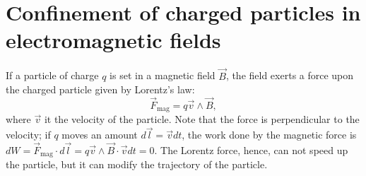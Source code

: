 \documentclass[a4paper,12pt,oneside]{book}
\begin{document}


\section[Confinement of charged particles]{Confinement of charged particles in electromagnetic fields}
\label{sec_drifts}
If a particle of charge $q$ is set in a magnetic field $\vec{B}$, the field exerts a force upon the charged particle given by Lorentz's law:
%
\begin{equation}
\vec{F}_\text{mag}=q \vec{v} \wedge \vec{B},
\end{equation}
%
where $\vec{v}$ it the velocity of the particle. Note that the force is perpendicular to the velocity; if $q$ moves an amount $d\vec{l}=\vec{v} dt$, the work done by the magnetic force is $dW=\vec{F}_\text{mag} \cdot d\vec{l}=q \vec{v} \wedge \vec{B} \cdot \vec{v} dt=0$. The Lorentz force, hence, can not speed up the particle, but it can modify the trajectory of the particle. 
\end{document}
